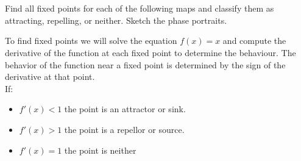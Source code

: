 \documentclass[11pt]{article}
\begin{document}
\hypertarget{4}{%
\section{}\label{4}}
Find all fixed points for each of the following maps and classify them as attracting,
repelling, or neither. Sketch the phase portraits.

To find fixed points we will solve the equation $f(x) = x$ and compute the derivative of the function at each fixed point to determine the behaviour. The behavior of the function near a fixed point is determined by the sign of the derivative at that point.\\
If:
\begin{itemize}
    \item $f'(x) < 1$ the point is an attractor or sink.
    \item $f'(x) > 1$ the point is a repellor or source.
    \item $f'(x) = 1$ the point is neither
\end{itemize}
\end{document}
